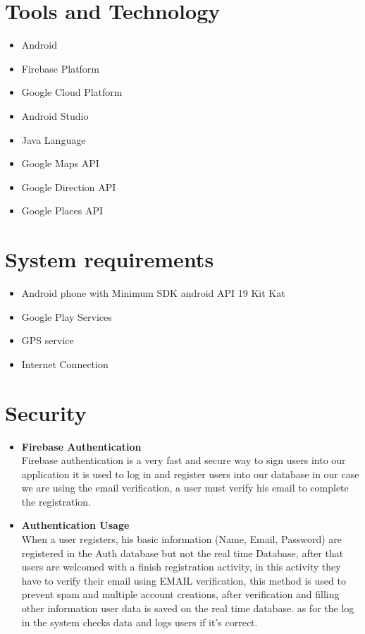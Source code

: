 \section{Tools and Technology}
\begin{itemize}
\item Android
\item Firebase Platform
\item Google Cloud Platform
\item Android Studio
\item Java Language
\item Google Maps API
\item Google Direction API
\item Google Places API
\end{itemize}

\section{System requirements}
\begin{itemize}
\item Android phone with Minimum SDK android API 19 Kit Kat 
\item Google Play Services
\item GPS service
\item Internet Connection
\end{itemize}

\section{Security}
\begin{itemize}
\item \textbf{Firebase Authentication}\\ 
Firebase authentication is a very fast and secure way to sign users into our application it is used to log in and register users into our database in our case we are using the email verification, a user must verify his email to complete the registration.
\item \textbf{Authentication Usage}
\\ When a user registers, his basic information (Name, Email, Password) are registered in the Auth database but not the real time Database, after that users are welcomed with a finish registration activity, in this activity they have to verify their email using EMAIL verification, this method is used to prevent spam and multiple account creations, after verification and filling other information user data is saved on the real time database. as for the log in the system checks data and logs users if it’s correct.
\end{itemize}

